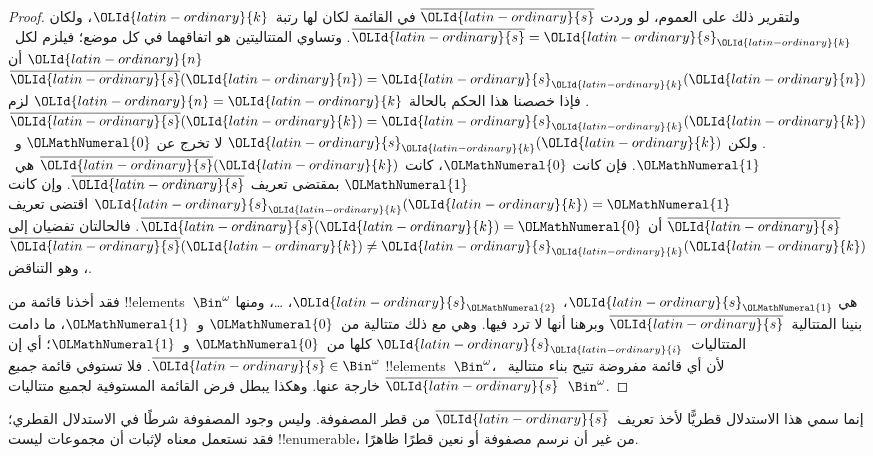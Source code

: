 \documentclass[../../../include/open-logic-section]{subfiles}
\begin{document}
\begin{proof}
ولتقرير ذلك على العموم، لو وردت $\overline{{\OLId{latin-ordinary}{s}}}$ في القائمة لكان لها رتبة~${\OLId{latin-ordinary}{k}}$، ولكان $\overline{{\OLId{latin-ordinary}{s}}} = {\OLId{latin-ordinary}{s}}_{{\OLId{latin-ordinary}{k}}}$. وتساوي المتتاليتين هو اتفاقهما في كل موضع؛ فيلزم لكل~${\OLId{latin-ordinary}{n}}$ أن $\overline{{\OLId{latin-ordinary}{s}}}({\OLId{latin-ordinary}{n}}) =
{\OLId{latin-ordinary}{s}}_{{\OLId{latin-ordinary}{k}}}({\OLId{latin-ordinary}{n}})$. فإذا خصصنا هذا الحكم بالحالة ${\OLId{latin-ordinary}{n}} = {\OLId{latin-ordinary}{k}}$ لزم $\overline{{\OLId{latin-ordinary}{s}}}({\OLId{latin-ordinary}{k}}) = {\OLId{latin-ordinary}{s}}_{{\OLId{latin-ordinary}{k}}}({\OLId{latin-ordinary}{k}})$. ولكن ${\OLId{latin-ordinary}{s}}_{\OLId{latin-ordinary}{k}}({\OLId{latin-ordinary}{k}})$ لا تخرج عن ${\OLMathNumeral{0}}$ و~${\OLMathNumeral{1}}$. فإن كانت ${\OLMathNumeral{0}}$، كانت $\overline{{\OLId{latin-ordinary}{s}}}({\OLId{latin-ordinary}{k}})$ هي~${\OLMathNumeral{1}}$ بمقتضى تعريف $\overline{{\OLId{latin-ordinary}{s}}}$. وإن كانت ${\OLId{latin-ordinary}{s}}_{\OLId{latin-ordinary}{k}}({\OLId{latin-ordinary}{k}}) = {\OLMathNumeral{1}}$ اقتضى تعريف $\overline{{\OLId{latin-ordinary}{s}}}$ أن $\overline{{\OLId{latin-ordinary}{s}}}({\OLId{latin-ordinary}{k}}) = {\OLMathNumeral{0}}$. فالحالتان تفضيان إلى $\overline{{\OLId{latin-ordinary}{s}}}({\OLId{latin-ordinary}{k}}) \neq {\OLId{latin-ordinary}{s}}_{{\OLId{latin-ordinary}{k}}}({\OLId{latin-ordinary}{k}})$، وهو التناقض.

فقد أخذنا قائمة من !!{element}s~$\Bin^\omega$ هي ${\OLId{latin-ordinary}{s}}_{\OLMathNumeral{1}}$، ${\OLId{latin-ordinary}{s}}_{\OLMathNumeral{2}}$، \dots{}، ومنها بنينا المتتالية~$\overline{{\OLId{latin-ordinary}{s}}}$ وبرهنا أنها لا ترد فيها. وهي مع ذلك متتالية من~${\OLMathNumeral{0}}$ و~${\OLMathNumeral{1}}$، ما دامت المتتاليات~${\OLId{latin-ordinary}{s}}_{\OLId{latin-ordinary}{i}}$ كلها من~${\OLMathNumeral{0}}$ و~${\OLMathNumeral{1}}$؛ أي إن $\overline{{\OLId{latin-ordinary}{s}}} \in
\Bin^\omega$. فلا تستوفي قائمة \emph{جميع} !!{element}s~$\Bin^\omega$، لأن أي قائمة مفروضة تتيح بناء متتالية~$\overline{{\OLId{latin-ordinary}{s}}}$ خارجة عنها. وهكذا يبطل فرض القائمة المستوفية لجميع متتاليات~$\Bin^\omega$.
\end{proof}

\begin{explain}
إنما سمي هذا الاستدلال قطريًّا لأخذ تعريف~$\overline{{\OLId{latin-ordinary}{s}}}$ من قطر المصفوفة. وليس وجود المصفوفة شرطًا في الاستدلال القطري؛ فقد نستعمل معناه لإثبات أن مجموعات ليست !!{enumerable}، من غير أن نرسم مصفوفة أو نعين قطرًا ظاهرًا.
\end{explain}
\end{document}
